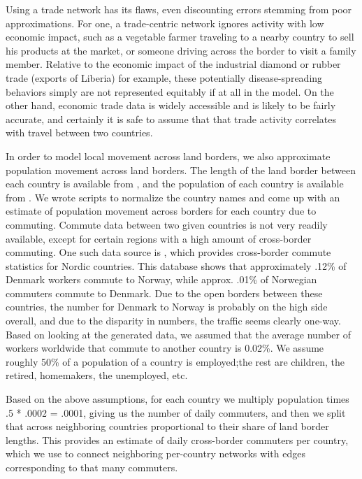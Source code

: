 \documentclass[10pt, journal,onecolumn]{IEEEtran}
\begin{document}
Using a trade network has its flaws, even discounting errors stemming from poor approximations.
For one, a trade-centric network ignores activity with low economic impact, such as
a vegetable farmer traveling to a nearby country to sell his products at the market, or someone
driving across the border to visit a family member. Relative to the economic impact of the industrial
diamond or rubber trade (exports of Liberia) for example, these potentially disease-spreading behaviors
simply are not represented equitably if at all in the model. On the other hand, economic trade data is
widely accessible and is likely to be fairly accurate,
and certainly it is safe to assume that that trade activity correlates with travel between two countries.

In order to model local movement across land borders, we also approximate population movement across land borders.
The length of the land border between each country is available from
\citep{cialandboundaries}, and the population of each country is available from \citep{ciapopulation}.
We wrote scripts to normalize the country names and come up with an estimate of population movement
across borders for each country due to commuting. Commute data between two given countries is not very
readily available, except for certain regions with a high amount of cross-border commuting.
One such data source is \citep{statnord}, which provides cross-border commute statistics for Nordic countries.
This database shows that approximately .12\% of Denmark workers commute to Norway, while approx. .01\% of
Norwegian commuters commute to Denmark. Due to the open borders between these countries, the number for
Denmark to Norway is probably on the high side overall, and due to the disparity in numbers, the traffic seems
clearly one-way. Based on looking at the generated data, we assumed that the average number of workers worldwide
that commute to another country is 0.02\%.
We assume roughly 50\% of a population of a country is employed;the rest are
children, the retired, homemakers, the unemployed, etc.

Based on the above assumptions, for each country we multiply population times .5 * .0002
= .0001, giving us the number of daily commuters, and then we split that across neighboring
countries proportional to their share of land border lengths. This provides an estimate
of daily cross-border commuters per country, which we use to connect neighboring per-country
networks with edges corresponding to that many commuters.
\end{document}
